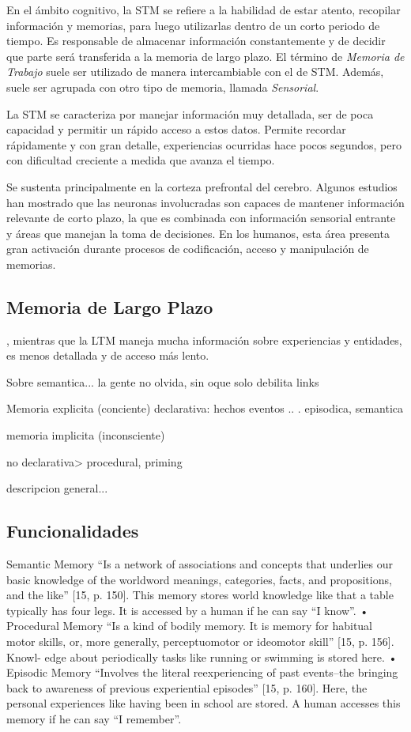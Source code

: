 En el \'ambito cognitivo, la STM se refiere a la habilidad de estar atento, recopilar informaci\'on  y memorias, para luego utilizarlas dentro de un corto periodo de tiempo. Es responsable de almacenar informaci\'on constantemente y de decidir que parte ser\'a transferida a la memoria de largo plazo. El t\'ermino de \textit{Memoria de Trabajo} suele ser utilizado de manera intercambiable con el de STM. Adem\'as, suele ser agrupada con otro tipo de memoria, llamada \textit{Sensorial}.

La STM se caracteriza por manejar informaci\'on muy detallada, ser de poca capacidad y permitir un r\'apido acceso a estos datos. Permite recordar r\'apidamente y con gran detalle, experiencias ocurridas hace pocos segundos, pero con dificultad creciente a medida que avanza el tiempo.

Se sustenta principalmente en la corteza prefrontal del cerebro. Algunos estudios han mostrado que las neuronas involucradas son capaces de mantener informaci\'on relevante de corto plazo, la que es combinada con informaci\'on sensorial entrante y \'areas que manejan la toma de decisiones. %
En los humanos, esta \'area presenta gran activaci\'on durante procesos de codificaci\'on, acceso y manipulaci\'on de memorias. %


\subsection{Memoria de Largo Plazo}

, mientras que la LTM maneja mucha informaci\'on sobre experiencias y entidades, es menos detallada y de acceso m\'as lento\cite{Eichenbaum:2008}.

Sobre semantica... la gente no olvida, sin oque solo debilita links


Memoria explicita (conciente)
declarativa: hechos eventos .. . episodica, semantica


memoria implicita (inconsciente)

no declarativa> procedural, priming

descripcion general...

\subsection{Funcionalidades}

Semantic Memory “Is a network of associations and concepts that underlies our basic knowledge of the
worldword meanings, categories, facts, and propositions, and the like” [15, p. 150]. This memory stores world knowledge like that a table typically has four legs. It is accessed by a human if he can say “I know”.
• Procedural Memory “Is a kind of bodily memory. It is memory for habitual motor skills, or, more generally,
perceptuomotor or ideomotor skill” [15, p. 156]. Knowl- edge about periodically tasks like running or swimming is stored here.
• Episodic Memory “Involves the literal reexperiencing of past events–the bringing back to awareness of previous
experiential episodes” [15, p. 160]. Here, the personal experiences like having been in school are stored. A human accesses this memory if he can say “I remember”.


